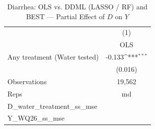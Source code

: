 \begin{table}[htbp]\centering
\def\sym#1{\ifmmode^{#1}\else\(^{#1}\)\fi}
\caption{Diarrhea: OLS vs. DDML (LASSO / RF) and BEST — Partial Effect of $D$ on $Y$}
\begin{tabular}{l*{1}{c}}
\toprule
                &\multicolumn{1}{c}{(1)}\\
                &\multicolumn{1}{c}{OLS}\\
\midrule
Any treatment (Water tested)&   -0.133\sym{***}\\
                &  (0.016)         \\
\midrule
Observations    &   19,562         \\
Reps            &       md         \\
D\_water\_treatment\_ss\_mse&                  \\
Y\_WQ26\_ss\_mse   &                  \\
\bottomrule
\end{tabular}
\end{table}
